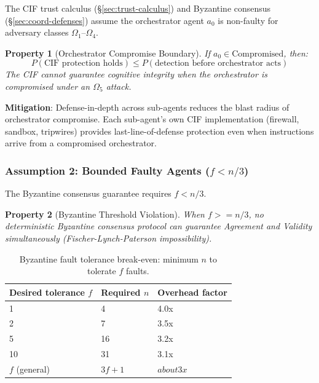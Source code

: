 \documentclass[
]{article}
\newtheorem{property}{Property}[section]
\begin{document}
The CIF trust calculus (§\ref{sec:trust-calculus}) and Byzantine
consensus (§\ref{sec:coord-defenses}) assume the orchestrator agent
\(a_0\) is non-faulty for adversary classes \(\Omega_1\)--\(\Omega_4\).

\begin{property}[Orchestrator Compromise Boundary]
\label{prop:orchestrator-limit}
If $a_0 \in \text{Compromised}$, then:
\begin{equation}
\label{eq:orchestrator-failure}
P(\text{CIF protection holds}) \leq P(\text{detection before orchestrator acts})
\end{equation}
The CIF cannot guarantee cognitive integrity when the orchestrator is compromised under an $\Omega_5$ attack.
\end{property}

\textbf{Mitigation}: Defense-in-depth across sub-agents reduces the
blast radius of orchestrator compromise. Each sub-agent's own CIF
implementation (firewall, sandbox, tripwires) provides
last-line-of-defense protection even when instructions arrive from a
compromised orchestrator.

\subsubsection{\texorpdfstring{Assumption 2: Bounded Faulty Agents
(\(f < n/3\))}{Assumption 2: Bounded Faulty Agents (f textless n/3)}}\label{assumption-2-bounded-faulty-agents-f-n3}

The Byzantine consensus guarantee requires \(f < n/3\).

\begin{property}[Byzantine Threshold Violation]
\label{prop:byz-limit}
When $f >= n/3$, no deterministic Byzantine consensus protocol can guarantee Agreement and Validity simultaneously (Fischer-Lynch-Paterson impossibility).
\end{property}

\begin{table}[htbp]
\centering
\caption{Byzantine fault tolerance break-even: minimum $n$ to tolerate $f$ faults.}
\label{tab:byz-limits}
\begin{tabular}{@{}lll@{}}
\toprule
Desired tolerance $f$ & Required $n$ & Overhead factor \\
\midrule
1 & 4 & 4.0x \\
2 & 7 & 3.5x \\
5 & 16 & 3.2x \\
10 & 31 & 3.1x \\
$f$ (general) & $3f+1$ & $about 3x$ \\
\bottomrule
\end{tabular}
\end{table}
\end{document}
